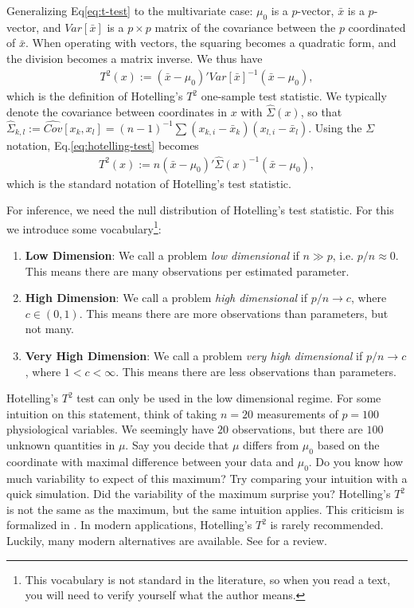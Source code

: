 \documentclass[]{book}
\providecommand{\tightlist}{%
  \setlength{\itemsep}{0pt}\setlength{\parskip}{0pt}}
\theoremstyle{definition}
\theoremstyle{definition}
\theoremstyle{definition}
\theoremstyle{remark}
\begin{document}
Generalizing Eq\eqref{eq:t-test} to the multivariate case:
\(\mu_0\) is a \(p\)-vector, \(\bar x\) is a \(p\)-vector, and \(Var[\bar x]\) is a \(p \times p\) matrix of the covariance between the \(p\) coordinated of \(\bar x\).
When operating with vectors, the squaring becomes a quadratic form, and the division becomes a matrix inverse.
We thus have
\begin{align}
  T^2(x):= (\bar{x}-\mu_0)' Var[\bar{x}]^{-1} (\bar{x}-\mu_0),
  \label{eq:hotelling-test}
\end{align}
which is the definition of Hotelling's \(T^2\) one-sample test statistic.
We typically denote the covariance between coordinates in \(x\) with \(\hat \Sigma(x)\), so that
\(\widehat \Sigma_{k,l}:=\widehat {Cov}[x_k,x_l]=(n-1)^{-1} \sum (x_{k,i}-\bar x_k)(x_{l,i}-\bar x_l)\).
Using the \(\Sigma\) notation, Eq.\eqref{eq:hotelling-test} becomes
\begin{align}
  T^2(x):= n (\bar{x}-\mu_0)' \hat \Sigma(x)^{-1} (\bar{x}-\mu_0),
\end{align}
which is the standard notation of Hotelling's test statistic.

For inference, we need the null distribution of Hotelling's test statistic. For this we introduce some vocabulary\footnote{This vocabulary is not standard in the literature, so when you read a text, you will need to verify yourself what the author means.}:

\begin{enumerate}
\def\labelenumi{\arabic{enumi}.}
\tightlist
\item
  \textbf{Low Dimension}:
  We call a problem \emph{low dimensional} if \(n \gg p\), i.e. \(p/n \approx 0\).
  This means there are many observations per estimated parameter.
\item
  \textbf{High Dimension}:
  We call a problem \emph{high dimensional} if \(p/n \to c\), where \(c\in (0,1)\).
  This means there are more observations than parameters, but not many.
\item
  \textbf{Very High Dimension}:
  We call a problem \emph{very high dimensional} if \(p/n \to c\), where \(1<c<\infty\).
  This means there are less observations than parameters.
\end{enumerate}

Hotelling's \(T^2\) test can only be used in the low dimensional regime.
For some intuition on this statement, think of taking \(n=20\) measurements of \(p=100\) physiological variables.
We seemingly have \(20\) observations, but there are \(100\) unknown quantities in \(\mu\).
Say you decide that \(\mu\) differs from \(\mu_0\) based on the coordinate with maximal difference between your data and \(\mu_0\).
Do you know how much variability to expect of this maximum?
Try comparing your intuition with a quick simulation.
Did the variability of the maximum surprise you?
Hotelling's \(T^2\) is not the same as the maximum, but the same intuition applies.
This criticism is formalized in \citet{bai1996effect}.
In modern applications, Hotelling's \(T^2\) is rarely recommended.
Luckily, many modern alternatives are available.
See \citet{rosenblatt2016better} for a review.
\end{document}
